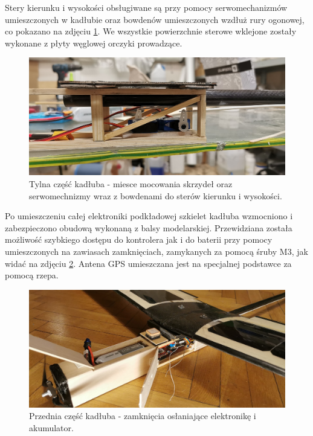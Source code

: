 \documentclass[12pt, a4paper]{article}
\begin{document}
Stery kierunku i wysokości obsługiwane są przy pomocy serwomechanizmów umieszczonych w kadłubie oraz bowdenów umieszczonych wzdłuż rury ogonowej, co pokazano na zdjęciu \ref{fig:tyl}. We wszystkie powierzchnie sterowe wklejone zostały wykonane z płyty węglowej orczyki prowadzące. 

\begin{figure}[ht]
    \centering
    \includegraphics[width=1\textwidth]{tyl}
    \caption{Tylna część kadłuba - miesce mocowania skrzydeł oraz serwomechnizmy wraz z bowdenami do sterów kierunku i wysokości.}
    \label{fig:tyl}
\end{figure}

Po umieszczeniu całej elektroniki podkładowej szkielet kadłuba wzmocniono i zabezpieczono obudową wykonaną z balsy modelarskiej. Przewidziana została możliwość szybkiego dostępu do kontrolera jak i do baterii przy pomocy umieszczonych na zawiasach zamknięciach, zamykanych za pomocą śruby M3, jak widać na zdjęciu \ref{fig:przod}. Antena GPS umieszczana jest na specjalnej podstawce za pomocą rzepa.

\begin{figure}[ht]
    \centering
    \includegraphics[width=1\textwidth]{przod}
    \caption{Przednia część kadłuba - zamknięcia osłaniające elektronikę i akumulator.}
    \label{fig:przod}
\end{figure}
\end{document}
